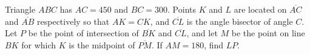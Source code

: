 Triangle $ ABC$ has $ AC = 450$ and $ BC = 300$. Points $ K$ and $ L$ are located on $ \overline{AC}$ and $ \overline{AB}$ respectively so that $ AK = CK$, and $ \overline{CL}$ is the angle bisector of angle $ C$. Let $ P$ be the point of intersection of $ \overline{BK}$ and $ \overline{CL}$, and let $ M$ be the point on line $ BK$ for which $ K$ is the midpoint of $ \overline{PM}$. If $ AM = 180$, find $ LP$.